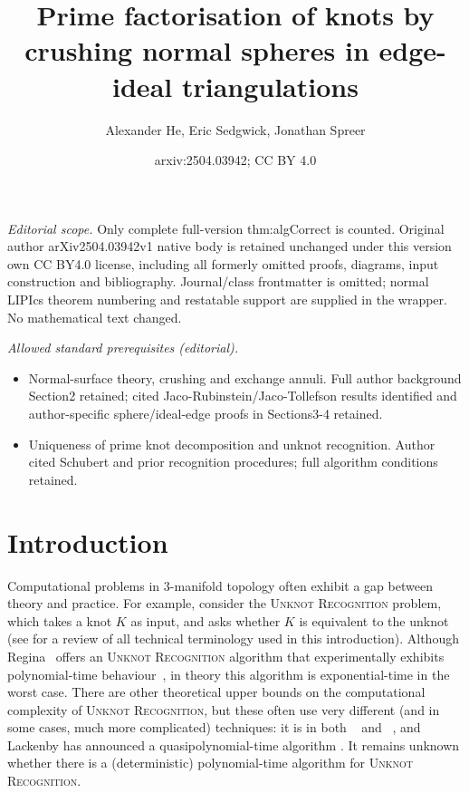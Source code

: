 \documentclass[10pt,a4paper]{amsart}
\title{Prime factorisation of knots by crushing normal spheres in edge-ideal triangulations}
\author{Alexander He, Eric Sedgwick, Jonathan Spreer}
\date{arxiv:2504.03942; CC BY 4.0}
\begin{document}
\maketitle
\noindent\textit{Editorial scope.} Only complete full-version thm:algCorrect is counted. Original author arXiv2504.03942v1 native body is retained unchanged under this version own CC BY4.0 license, including all formerly omitted proofs, diagrams, input construction and bibliography. Journal/class frontmatter is omitted; normal LIPIcs theorem numbering and restatable support are supplied in the wrapper. No mathematical text changed.\par\medskip
\noindent\textit{Allowed standard prerequisites (editorial).}\begin{itemize}
\item Normal-surface theory, crushing and exchange annuli. Full author background Section2 retained; cited Jaco-Rubinstein/Jaco-Tollefson results identified and author-specific sphere/ideal-edge proofs in Sections3-4 retained.
\item Uniqueness of prime knot decomposition and unknot recognition. Author cited Schubert and prior recognition procedures; full algorithm conditions retained.
\end{itemize}\medskip
\section{Introduction}\label{sec:intro}

Computational problems in $3$-manifold topology often exhibit a gap between theory and practice.
For example, consider the \textsc{Unknot Recognition} problem, which takes a knot $K$ as input, and asks whether $K$ is equivalent to the unknot (see  for a review of all technical terminology used in this introduction).
Although Regina~\cite{Regina} offers an \textsc{Unknot Recognition} algorithm that experimentally exhibits polynomial-time behaviour~\cite{burton2012unknot},
in theory this algorithm is exponential-time in the worst case.
There are other theoretical upper bounds on the computational complexity of \textsc{Unknot Recognition}, but these often use very different (and in some cases, much more complicated) techniques:
it is in both \NP~\cite{hass1999computational} and \coNP~\cite{kuperberg2014knottedness,lackenby2016efficient},
and Lackenby has announced a quasipolynomial-time algorithm \cite{LackenbyTalk}.
It remains unknown whether there is a (deterministic) polynomial-time algorithm for \textsc{Unknot Recognition}.
\end{document}
